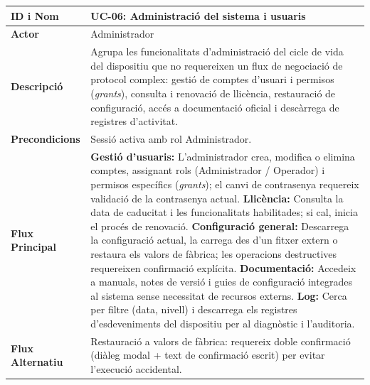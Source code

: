 \begin{table}[htbp]
  \centering
  \small
  \begin{tabular}{|l|p{10cm}|}
    \hline
    \rowcolor{backcolour} \textbf{ID i Nom} & \textbf{UC-06: Administració del sistema i usuaris}                                                                            \\ \hline
    \textbf{Actor}                          & Administrador                                                                                                                  \\ \hline
    \textbf{Descripció}                     & Agrupa les funcionalitats d'administració del cicle de vida del dispositiu que no requereixen un flux de negociació de protocol complex: gestió de comptes d'usuari i permisos (\textit{grants}), consulta i renovació de llicència, restauració de configuració, accés a documentació oficial i descàrrega de registres d'activitat.                                 \\ \hline
    \textbf{Precondicions}                  & Sessió activa amb rol Administrador.                                                                                           \\ \hline
    \textbf{Flux Principal}                 &
    \textbf{Gestió d'usuaris:} L'administrador crea, modifica o elimina comptes, assignant rols (Administrador / Operador) i permisos específics (\textit{grants}); el canvi de contrasenya requereix validació de la contrasenya actual. \newline
    \textbf{Llicència:} Consulta la data de caducitat i les funcionalitats habilitades; si cal, inicia el procés de renovació. \newline
    \textbf{Configuració general:} Descarrega la configuració actual, la carrega des d'un fitxer extern o restaura els valors de fàbrica; les operacions destructives requereixen confirmació explícita. \newline
    \textbf{Documentació:} Accedeix a manuals, notes de versió i guies de configuració integrades al sistema sense necessitat de recursos externs. \newline
    \textbf{Log:} Cerca per filtre (data, nivell) i descarrega els registres d'esdeveniments del dispositiu per al diagnòstic i l'auditoria.  \\ \hline
    \textbf{Flux Alternatiu}                &
    Restauració a valors de fàbrica: requereix doble confirmació (diàleg modal + text de confirmació escrit) per evitar l'execució accidental. \newline

\end{tabular}
\end{table}
